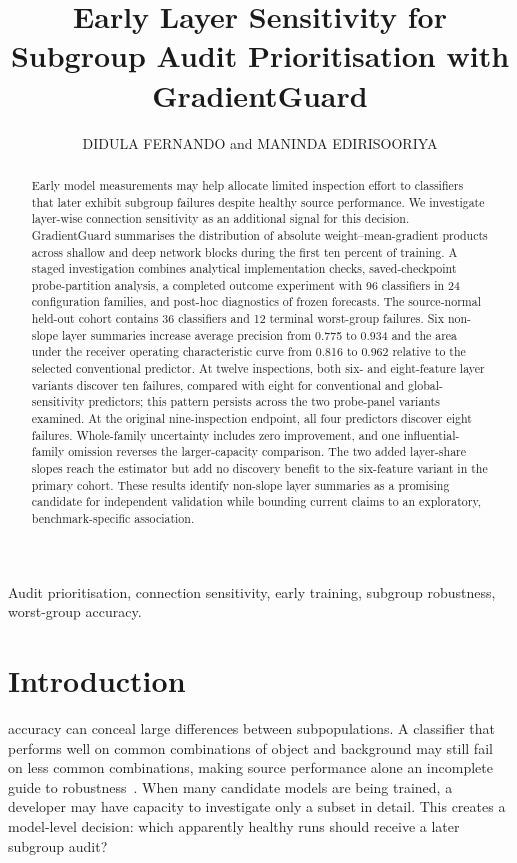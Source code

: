 \documentclass[nolineno]{ieeeaccess}
\begin{document}
\doi{}
\title{Early Layer Sensitivity for Subgroup Audit Prioritisation with GradientGuard}
\author{\uppercase{Didula Fernando} and \uppercase{Maninda Edirisooriya}}
\corresp{}
\begin{abstract}
Early model measurements may help allocate limited inspection effort to classifiers that later exhibit subgroup failures despite healthy source performance. We investigate layer-wise connection sensitivity as an additional signal for this decision. GradientGuard summarises the distribution of absolute weight--mean-gradient products across shallow and deep network blocks during the first ten percent of training. A staged investigation combines analytical implementation checks, saved-checkpoint probe-partition analysis, a completed outcome experiment with 96 classifiers in 24 configuration families, and post-hoc diagnostics of frozen forecasts. The source-normal held-out cohort contains 36 classifiers and 12 terminal worst-group failures. Six non-slope layer summaries increase average precision from 0.775 to 0.934 and the area under the receiver operating characteristic curve from 0.816 to 0.962 relative to the selected conventional predictor. At twelve inspections, both six- and eight-feature layer variants discover ten failures, compared with eight for conventional and global-sensitivity predictors; this pattern persists across the two probe-panel variants examined. At the original nine-inspection endpoint, all four predictors discover eight failures. Whole-family uncertainty includes zero improvement, and one influential-family omission reverses the larger-capacity comparison. The two added layer-share slopes reach the estimator but add no discovery benefit to the six-feature variant in the primary cohort. These results identify non-slope layer summaries as a promising candidate for independent validation while bounding current claims to an exploratory, benchmark-specific association.
\end{abstract}
\begin{keywords}
Audit prioritisation, connection sensitivity, early training, subgroup robustness, worst-group accuracy.
\end{keywords}
\titlepgskip=-10pt
\maketitle
\pagestyle{headings}

\section{Introduction}
\label{sec:intro}
 accuracy can conceal large differences between subpopulations. A classifier that performs well on common combinations of object and background may still fail on less common combinations, making source performance alone an incomplete guide to robustness~\cite{sagawa,spare,subpopbench}. When many candidate models are being trained, a developer may have capacity to investigate only a subset in detail. This creates a model-level decision: which apparently healthy runs should receive a later subgroup audit?
\end{document}
